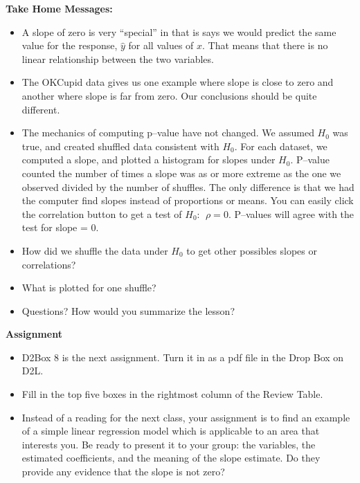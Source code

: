 \begin{center}
  {\bf Take Home Messages:}\vspace{-.4cm}
\end{center}
\begin{itemize}
  \item A slope of zero is very ``special'' in that is says we would
    predict the same value for the response, $\hat{y}$ for all values
    of $x$.  That means that there is no linear relationship between
    the two variables.
  \item The OKCupid data gives us one example where slope is close to
    zero and another where slope is far from zero.  Our conclusions
    should be quite different.
  \item The mechanics of computing p--value have not changed.  We
    assumed $H_0$ was true, and created shuffled data consistent with
    $H_0$.  For each dataset, we computed a slope, and plotted a
    histogram for slopes under $H_0$. P--value counted the number of
    times a slope was as or more extreme as the one we observed
    divided by the number of shuffles.  The only difference is that we
    had the computer find slopes instead of proportions or means.  You
    can easily click the correlation button to get a test of $H_0:\ \
    \rho = 0$. P--values will agree with the test for slope = 0.
  \item How did we shuffle the data under $H_0$ to get other possibles
    slopes or correlations?
  \item What is plotted for one shuffle?
 \item 
 Questions? How would you summarize the lesson? \vspace*{\fill}

\end{itemize}


\noindent
{\bf Assignment} \vspace{-.2in}
\begin{itemize}
\item D2Box 8 is the next assignment.  Turn it in as a pdf file in the
  Drop Box on D2L. 
\item Fill in the top five boxes in the rightmost column   of
  the Review Table.
\item Instead of a reading for the next class, your assignment is to
  find an example of a simple linear regression model which is
  applicable to an area that interests you.  Be ready to present it to
  your group:  the variables, the estimated coefficients, and the
  meaning of the slope estimate.  Do they provide any evidence that
  the slope is not zero?
\end{itemize}
